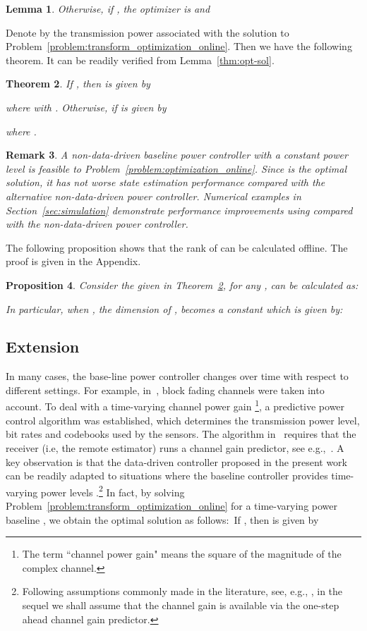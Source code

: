 \documentclass[twocolumn]{autart}    \usepackage{cite}
\newtheorem{theorem}{Theorem}[section]
\newtheorem{lemma}[theorem]{Lemma}
\newtheorem{proposition}[theorem]{Proposition}
\newtheorem{remark}[theorem]{Remark}
\begin{document}
{{\begin{lemma}
Otherwise, if , the optimizer is  and

\end{lemma}
Denote by  the transmission power associated with
the solution to Problem~\ref{problem:transform_optimization_online}. Then we have the following theorem. It can be readily
verified from Lemma~\ref{thm:opt-sol}.
\begin{theorem}\label{thm:opt-schedule}
If , then 
is given by

where
 with .
Otherwise, if 
 is given by

where .
\end{theorem}
\begin{remark}\label{remark:better-performance}
{A non-data-driven baseline power controller
with a constant power level  is
feasible to
Problem~\ref{problem:optimization_online}. Since
 is the optimal solution, it has not
worse state estimation performance
compared with the alternative non-data-driven
power controller. Numerical examples in
Section~\ref{sec:simulation} demonstrate performance improvements using
 compared with the non-data-driven power controller.}
\end{remark}
The following proposition shows that the rank of  can be calculated offline. The proof is given in the Appendix.
\begin{proposition}\label{proposition: rank}
Consider the  given in Theorem~\ref{thm:opt-schedule},
for any ,  can be calculated
as:

In particular, when , the dimension of , 
becomes a constant which is given by:

\end{proposition}

\subsection{Extension }\label{subsec:vary-power-in-time}
 In many
cases, the base-line power controller
changes over time with
respect to different
settings. For example, in~\cite{queahl10}, block fading channels were taken
into account. To deal with a time-varying channel power gain \footnote{
The term ``channel power gain" means the square of the magnitude of the complex channel.}, a predictive power control algorithm
was established, which
determines the transmission power level, bit rates and
codebooks used by the sensors.
{
The algorithm in~\cite{queahl10} requires
that the receiver (i.e, the remote estimator) runs a channel gain predictor, see e.g.,~\cite{linahl02}.}
{A key observation is that the data-driven controller proposed in the present work can be readily adapted to situations where the baseline controller provides time-varying power levels .\footnote{{ Following assumptions commonly made in the literature, see, e.g., \cite{queahl10,quevedo2012kalman}, in the sequel we shall assume that the channel gain  is available via the one-step ahead channel gain predictor.}}}
In fact, by solving Problem~\ref{problem:transform_optimization_online}
for a time-varying power
baseline , we obtain the optimal
solution  as
follows:~If , then 
is given by

}}
\end{document}
